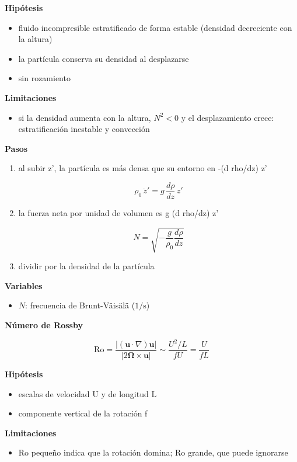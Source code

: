 \documentclass[10pt,openany]{book}
\begin{document}
\begin{tcolorbox}[title={Desarrollos del modelo}, studiumdef, breakable]
\noindent\textbf{Hipótesis}
\begin{itemize}
\item fluido incompresible estratificado de forma estable (densidad decreciente con la altura)
\item la partícula conserva su densidad al desplazarse
\item sin rozamiento
\end{itemize}

\noindent\textbf{Limitaciones}
\begin{itemize}
\item si la densidad aumenta con la altura, \(N^2 < 0\) y el desplazamiento crece: estratificación inestable y convección
\end{itemize}

\noindent\textbf{Pasos}
\begin{enumerate}
\item
al subir z', la partícula es más densa que su entorno en -(d rho/dz) z'

\[
\rho_0\,\ddot z' = g\,\frac{d\rho}{dz}\,z'
\]
\item
la fuerza neta por unidad de volumen es g (d rho/dz) z'

\[
N = \sqrt{-\frac{g}{\rho_0}\frac{d\rho}{dz}}
\]
\item
dividir por la densidad de la partícula
\end{enumerate}

\noindent\textbf{Variables}
\begin{itemize}
\item $N$: frecuencia de Brunt-Väisälä ($\mathrm{1/s}$)
\end{itemize}



\noindent\textbf{Número de Rossby}

\[
\mathrm{Ro} = \frac{|(\mathbf{u}\cdot\nabla)\mathbf{u}|}{|2\boldsymbol{\Omega}\times\mathbf{u}|} \sim \frac{U^{2}/L}{f U} = \frac{U}{f L}
\]

\noindent\textbf{Hipótesis}
\begin{itemize}
\item escalas de velocidad U y de longitud L
\item componente vertical de la rotación f
\end{itemize}

\noindent\textbf{Limitaciones}
\begin{itemize}
\item Ro pequeño indica que la rotación domina; Ro grande, que puede ignorarse
\end{itemize}


\end{tcolorbox}
\end{document}
